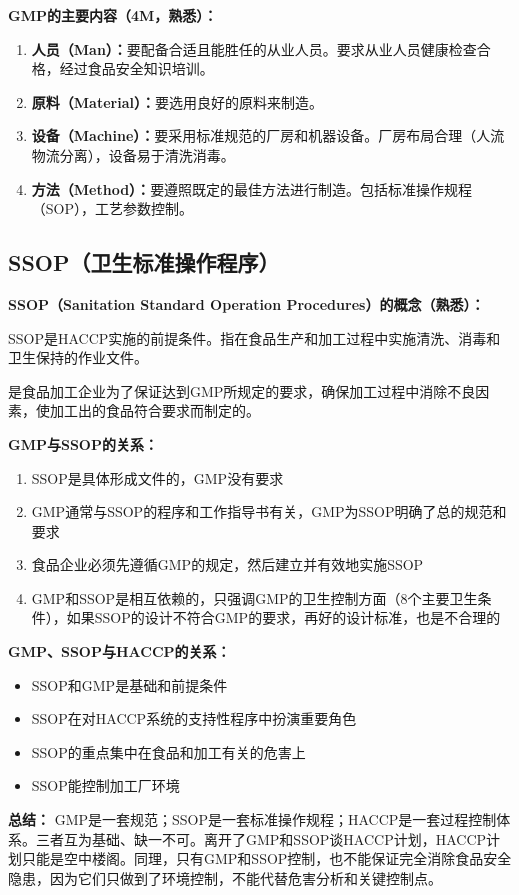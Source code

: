 \begin{keybox}
\textbf{GMP的主要内容（4M，熟悉）：}
\begin{enumerate}[leftmargin=*]
    \item \textbf{人员（Man）：}要配备合适且能胜任的从业人员。要求从业人员健康检查合格，经过食品安全知识培训。
    \item \textbf{原料（Material）：}要选用良好的原料来制造。
    \item \textbf{设备（Machine）：}要采用标准规范的厂房和机器设备。厂房布局合理（人流物流分离），设备易于清洗消毒。
    \item \textbf{方法（Method）：}要遵照既定的最佳方法进行制造。包括标准操作规程（SOP），工艺参数控制。
\end{enumerate}
\end{keybox}

\subsection{SSOP（卫生标准操作程序）}

\begin{defbox}
\textbf{SSOP（Sanitation Standard Operation Procedures）的概念（熟悉）：}

SSOP是HACCP实施的前提条件。指在食品生产和加工过程中实施清洗、消毒和卫生保持的作业文件。

是食品加工企业为了保证达到GMP所规定的要求，确保加工过程中消除不良因素，使加工出的食品符合要求而制定的。

\textbf{GMP与SSOP的关系：}
\begin{enumerate}[leftmargin=*]
    \item SSOP是具体形成文件的，GMP没有要求
    \item GMP通常与SSOP的程序和工作指导书有关，GMP为SSOP明确了总的规范和要求
    \item 食品企业必须先遵循GMP的规定，然后建立并有效地实施SSOP
    \item GMP和SSOP是相互依赖的，只强调GMP的卫生控制方面（8个主要卫生条件），如果SSOP的设计不符合GMP的要求，再好的设计标准，也是不合理的
\end{enumerate}

\textbf{GMP、SSOP与HACCP的关系：}
\begin{itemize}[leftmargin=*]
    \item SSOP和GMP是基础和前提条件
    \item SSOP在对HACCP系统的支持性程序中扮演重要角色
    \item SSOP的重点集中在食品和加工有关的危害上
    \item SSOP能控制加工厂环境
\end{itemize}

\textbf{总结：}
GMP是一套规范；SSOP是一套标准操作规程；HACCP是一套过程控制体系。三者互为基础、缺一不可。离开了GMP和SSOP谈HACCP计划，HACCP计划只能是空中楼阁。同理，只有GMP和SSOP控制，也不能保证完全消除食品安全隐患，因为它们只做到了环境控制，不能代替危害分析和关键控制点。
\end{defbox}

